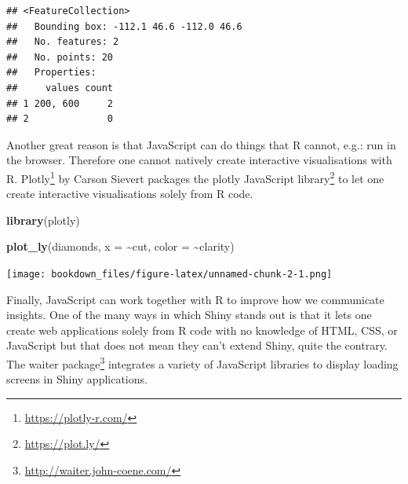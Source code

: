 \documentclass[
]{krantz}
\makeatletter
\newenvironment{Shaded}{\begin{snugshade}}{\end{snugshade}}
\newcommand{\DataTypeTok}[1]{\textcolor[rgb]{0.27,0.27,0.27}{#1}}
\newcommand{\KeywordTok}[1]{\textcolor[rgb]{0.27,0.27,0.27}{\textbf{#1}}}
\newcommand{\NormalTok}[1]{#1}
\newcommand{\OperatorTok}[1]{\textcolor[rgb]{0.43,0.43,0.43}{\textbf{#1}}}
\newcommand{\StringTok}[1]{\textcolor[rgb]{0.5,0.5,0.5}{#1}}
\renewcommand{\href}[2]{#2\footnote{\url{#1}}}
\newenvironment{kframe}{%
\medskip{}
\setlength{\fboxsep}{.8em}
 \def\at@end@of@kframe{}%
 \ifinner\ifhmode%
  \def\at@end@of@kframe{\end{minipage}}%
  \begin{minipage}{\columnwidth}%
 \fi\fi%
 \def\FrameCommand##1{\hskip\@totalleftmargin \hskip-\fboxsep
 \colorbox{shadecolor}{##1}\hskip-\fboxsep
     \hskip-\linewidth \hskip-\@totalleftmargin \hskip\columnwidth}%
 \MakeFramed {\advance\hsize-\width
   \@totalleftmargin\z@ \linewidth\hsize
   \@setminipage}}%
 {\par\unskip\endMakeFramed%
 \at@end@of@kframe}
\renewenvironment{Shaded}{\begin{kframe}}{\end{kframe}}
\makeatother
\begin{document}
\begin{Shaded}
\end{Shaded}

\begin{verbatim}
## <FeatureCollection>
##   Bounding box: -112.1 46.6 -112.0 46.6
##   No. features: 2
##   No. points: 20
##   Properties: 
##     values count
## 1 200, 600     2
## 2              0
\end{verbatim}

Another great reason is that JavaScript can do things that R cannot, e.g.: run in the browser. Therefore one cannot natively create interactive visualisations with R. \href{https://plotly-r.com/}{Plotly} \citep{R-plotly} by Carson Sievert packages the \href{https://plot.ly/}{plotly JavaScript library} to let one create interactive visualisations solely from R code.

\begin{Shaded}
\begin{Highlighting}[]
\KeywordTok{library}\NormalTok{(plotly)}

\KeywordTok{plot\_ly}\NormalTok{(diamonds, }\DataTypeTok{x =} \OperatorTok{\textasciitilde{}}\NormalTok{cut, }\DataTypeTok{color =} \OperatorTok{\textasciitilde{}}\NormalTok{clarity)}
\end{Highlighting}
\end{Shaded}

\texttt{[image: bookdown\_files/figure-latex/unnamed-chunk-2-1.png]}

Finally, JavaScript can work together with R to improve how we communicate insights. One of the many ways in which Shiny stands out is that it lets one create web applications solely from R code with no knowledge of HTML, CSS, or JavaScript but that does not mean they can't extend Shiny, quite the contrary. The \href{http://waiter.john-coene.com/}{waiter package} \citep{R-waiter} integrates a variety of JavaScript libraries to display loading screens in Shiny applications.
\end{document}
